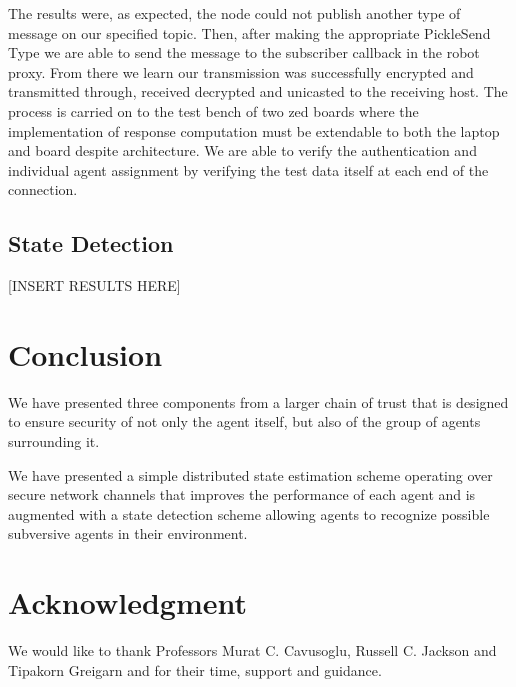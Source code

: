 \documentclass[conference]{IEEEtran}
\begin{document}
The results were, as expected, the node could not publish another type of message on our specified topic. Then, after making the appropriate PickleSend Type we are able to send the message to the subscriber callback in the robot proxy. From there we learn our transmission was successfully encrypted and transmitted through, received decrypted and unicasted to the receiving host. The process is carried on to the test bench of two zed boards where the implementation of response computation must be extendable to both the laptop and board despite architecture. We are able to verify the authentication and individual agent assignment by verifying the test data itself at each end of the connection.

\subsection{State Detection}
[INSERT RESULTS HERE]

\section{Conclusion}
We have presented three components from a larger chain of trust that is designed to ensure security of not only the agent itself, but also of the group of agents surrounding it.

We have presented a simple distributed state estimation scheme operating over secure network channels that improves the performance of each agent and is augmented with a state detection scheme allowing agents to recognize possible subversive agents in their environment.

\section*{Acknowledgment}
We would like to thank Professors Murat C. Cavusoglu, Russell C. Jackson and Tipakorn Greigarn and for their time, support and guidance.

\printbibliography
\end{document}
